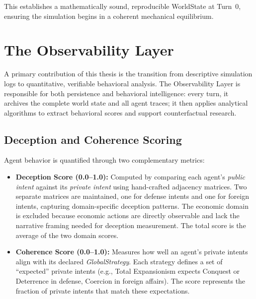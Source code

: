This establishes a mathematically sound, reproducible WorldState at Turn~0, ensuring the simulation begins in a coherent mechanical equilibrium.





\section{The Observability Layer}
\label{sec:observability}
A primary contribution of this thesis is the transition from descriptive simulation logs to quantitative, verifiable behavioral analysis. The Observability Layer is responsible for both persistence and behavioral intelligence: every turn, it archives the complete world state and all agent traces; it then applies analytical algorithms to extract behavioral scores and support counterfactual research.

\subsection{Deception and Coherence Scoring}
Agent behavior is quantified through two complementary metrics:

\begin{itemize}
    \item \textbf{Deception Score (0.0--1.0):} Computed by comparing each agent's \textit{public intent} against its \textit{private intent} using hand-crafted adjacency matrices. Two separate matrices are maintained, one for defense intents and one for foreign intents, capturing domain-specific deception patterns. The economic domain is excluded because economic actions are directly observable and lack the narrative framing needed for deception measurement. The total score is the average of the two domain scores.
    \item \textbf{Coherence Score (0.0--1.0):} Measures how well an agent's private intents align with its declared \textit{GlobalStrategy}. Each strategy defines a set of ``expected'' private intents (e.g., Total Expansionism expects Conquest or Deterrence in defense, Coercion in foreign affairs). The score represents the fraction of private intents that match these expectations.
\end{itemize}

